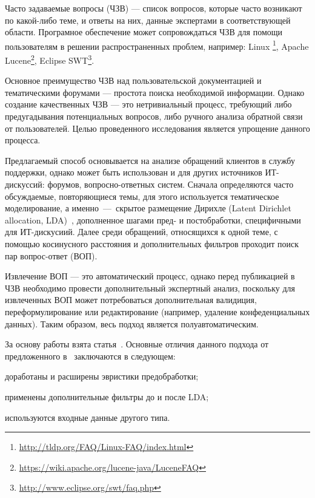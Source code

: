 \intro

Часто задаваемые вопросы (ЧЗВ) --- список вопросов, которые часто возникают по какой-либо теме, и ответы на них, данные экспертами в соответствующей области. Програмное обеспечение может сопровождаться ЧЗВ для помощи пользователям в решении распространенных проблем, например: Linux \footnote{\url{http://tldp.org/FAQ/Linux-FAQ/index.html}}, Apache Lucene\footnote{\url{https://wiki.apache.org/lucene-java/LuceneFAQ}}, Eclipse SWT\footnote{\url{http://www.eclipse.org/swt/faq.php}}.

Основное преимущество ЧЗВ над пользовательской документацией и тематическими форумами --- простота поиска необходимой информации. Однако создание качественных ЧЗВ --- это нетривиальный процесс, требующий либо предугадывания потенциальных вопросов, либо ручного анализа обратной связи от пользователей. Целью проведенного исследования является упрощение данного процесса.

Предлагаемый способ основывается на анализе обращений клиентов в службу поддержки, однако может быть использован и для других источников ИТ-дискуссий: форумов, вопросно-ответных систем. Сначала определяются часто обсуждаемые, повторяющиеся темы, для этого используется тематическое моделирование, а именно~---~скрытое размещение Дирихле (Latent Dirichlet allocation, LDA)~\cite{LDA}, дополненное шагами пред- и постобработки, специфичными для ИТ-дискусиий. Далее среди обращений, относящихся к одной теме, с помощью косинусного расстояния и дополнительных фильтров проходит поиск пар вопрос-ответ (ВОП).


Извлечение ВОП --- это автоматический процесс, однако перед публикацией в ЧЗВ необходимо провести дополнительный экспертный анализ, поскольку для извлеченных ВОП может потребоваться дополнительная валидиция, переформулирование или редактирование (например, удаление конфеденциальных данных). Таким образом, весь подход является полуавтоматическим.

За основу работы взята статья~\cite{original}. Основные отличия данного подхода от предложенного в~\cite{original} заключаются в следующем:

\begin{itemize*}
\item доработаны и расширены эвристики предобработки;
\item применены дополнительные фильтры до и после LDA;
\item используются входные данные другого типа.
\end{itemize*}

